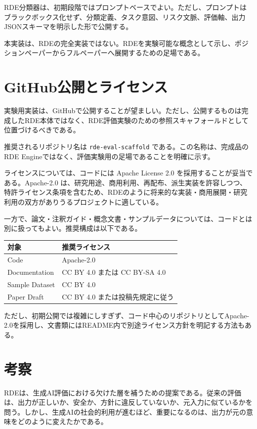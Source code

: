 \documentclass[
  a4paper]{ltjsarticle}
\begin{document}
RDE分類器は、初期段階ではプロンプトベースでよい。ただし、プロンプトはブラックボックス化せず、分類定義、タスク意図、リスク文脈、評価軸、出力JSONスキーマを明示した形で公開する。

本実装は、RDEの完全実装ではない。RDEを実験可能な概念として示し、ポジションペーパーからフルペーパーへ展開するための足場である。

\section{GitHub公開とライセンス}\label{github-publication-and-licensing}

実験用実装は、GitHubで公開することが望ましい。ただし、公開するものは完成したRDE本体ではなく、RDE評価実験のための参照スキャフォールドとして位置づけるべきである。

推奨されるリポジトリ名は \texttt{rde-eval-scaffold}
である。この名称は、完成品のRDE
Engineではなく、評価実験用の足場であることを明確に示す。

ライセンスについては、コードには Apache License 2.0
を採用することが妥当である。Apache-2.0
は、研究用途、商用利用、再配布、派生実装を許容しつつ、特許ライセンス条項を含むため、RDEのように将来的な実装・商用展開・研究利用の双方がありうるプロジェクトに適している。

一方で、論文・注釈ガイド・概念文書・サンプルデータについては、コードとは別に扱ってもよい。推奨構成は以下である。

\begin{longtable}[]{@{}ll@{}}
\toprule\noalign{}
対象 & 推奨ライセンス \\
\midrule\noalign{}
\endhead
\bottomrule\noalign{}
\endlastfoot
Code & Apache-2.0 \\
Documentation & CC BY 4.0 または CC BY-SA 4.0 \\
Sample Dataset & CC BY 4.0 \\
Paper Draft & CC BY 4.0 または投稿先規定に従う \\
\end{longtable}

ただし、初期公開では複雑にしすぎず、コード中心のリポジトリとしてApache-2.0を採用し、文書類にはREADME内で別途ライセンス方針を明記する方法もある。

\section{考察}\label{discussion}

RDEは、生成AI評価における欠けた層を補うための提案である。従来の評価は、出力が正しいか、安全か、方針に違反していないか、元入力に似ているかを問う。しかし、生成AIの社会的利用が進むほど、重要になるのは、出力が元の意味をどのように変えたかである。
\end{document}
